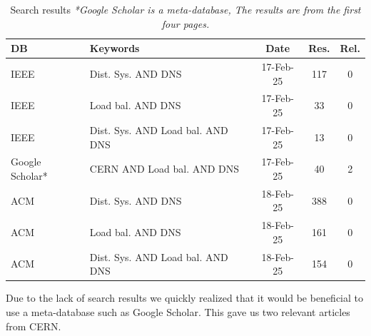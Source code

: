 \documentclass[12pt]{article}
\begin{document}
\begin{table}[H]
    \centering
    \begin{tabularx}{\textwidth}{|l|X|c|c|c|}
        \hline
        \textbf{DB} & \textbf{Keywords} & \textbf{Date} & \textbf{Res.} & \textbf{Rel.} \\
        \hline
        IEEE & Dist. Sys. AND DNS & 17-Feb-25 & 117 & 0 \\
        \hline
        IEEE & Load bal. AND DNS & 17-Feb-25 & 33 & 0 \\
        \hline
        IEEE & Dist. Sys. AND Load bal. AND DNS & 17-Feb-25 & 13 & 0 \\
        \hline
        Google Scholar* & CERN AND Load bal. AND DNS & 17-Feb-25 & 40 & 2 \\
        \hline
        ACM & Dist. Sys. AND DNS & 18-Feb-25 & 388 & 0 \\
        \hline
        ACM & Load bal. AND DNS & 18-Feb-25 & 161 & 0 \\
        \hline
        ACM & Dist. Sys. AND Load bal. AND DNS & 18-Feb-25 & 154 & 0 \\
        \hline
    \end{tabularx}
    \caption{Search results \textit{*Google Scholar is a meta-database, The results are from the first four pages.}}
\end{table}

Due to the lack of search results we quickly realized that it would be beneficial to use a meta-database such as Google Scholar.
This gave us two relevant articles from CERN.

\newpage
\end{document}
